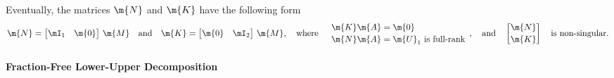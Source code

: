 %
Eventually, the matrices $\m{N}$ and $\m{K}$ have the following form
%
\begin{equation}
    \m{N} = \begin{bmatrix} \mI_1 & \m{0} \end{bmatrix} \, \m{M}
    \quad \text{and} \quad
    \m{K} = \begin{bmatrix} \m{0} & \mI_2 \end{bmatrix} \, \m{M},
    \quad \text{where} \quad
    \begin{array}{l}
        \m{K}\m{A} = \m{0} \\[0.2em]
        \m{N}\m{A} = \m{U}_1 ~ \text{is full-rank}
    \end{array},
    \quad \text{and} \quad
    \begin{bmatrix} \m{N} \\[0.2em] \m{K} \end{bmatrix} \quad \text{is non-singular.}
\end{equation}

\paragraph{Fraction-Free Lower-Upper Decomposition}

